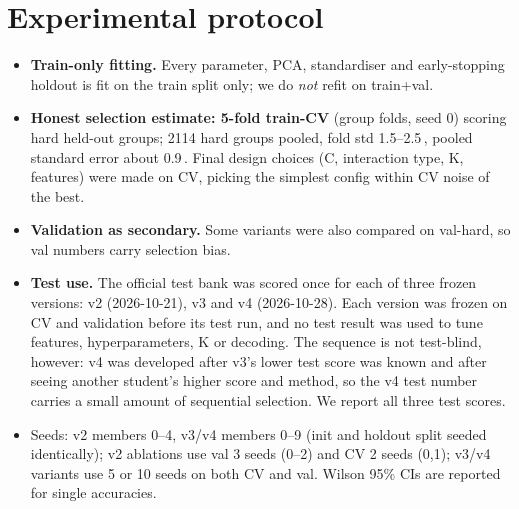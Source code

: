 \documentclass[10pt,a4paper]{article}
\newcommand{\pt}{\,\text{pt}}
\begin{document}
\section{Experimental protocol}
\begin{itemize}
\item \textbf{Train-only fitting.} Every parameter, PCA, standardiser and early-stopping holdout is fit on the train split only; we do \emph{not} refit on train+val.
\item \textbf{Honest selection estimate: 5-fold train-CV} (group folds, seed 0) scoring hard held-out groups; 2114 hard groups pooled, fold std 1.5--2.5\pt, pooled standard error about 0.9\pt. Final design choices (C, interaction type, K, features) were made on CV, picking the simplest config within CV noise of the best.
\item \textbf{Validation as secondary.} Some variants were also compared on val-hard, so val numbers carry selection bias.
\item \textbf{Test use.} The official test bank was scored once for each of three frozen versions: v2 (2026-10-21), v3 and v4 (2026-10-28). Each version was frozen on CV and validation before its test run, and no test result was used to tune features, hyperparameters, K or decoding. The sequence is not test-blind, however: v4 was developed after v3's lower test score was known and after seeing another student's higher score and method, so the v4 test number carries a small amount of sequential selection. We report all three test scores.
\item Seeds: v2 members 0--4, v3/v4 members 0--9 (init and holdout split seeded identically); v2 ablations use val 3 seeds (0--2) and CV 2 seeds (0,1); v3/v4 variants use 5 or 10 seeds on both CV and val. Wilson 95\% CIs are reported for single accuracies.
\end{itemize}
\end{document}
